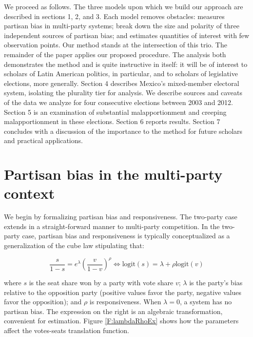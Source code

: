 \documentclass[letter,12pt]{article}
\begin{document}
We proceed as follows. The three models upon which we build our approach are described in sections 1, 2, and 3. Each model removes obstacles: \citet{king.1990elRespBiasMultiparty} measures partisan bias in multi-party systems; \citet{grofman.etalBiasMalapp.1997} break down the size and polarity of three independent sources of partisan bias; and \citet{linzerSeatVoteElasticity2012} estimates quantities of interest with few observation points. Our method stands at the intersection of this trio. The remainder of the paper applies our proposed procedure. The analysis both demonstrates the method and is quite instructive in itself: it will be of interest to scholars of Latin American politics, in particular, and to scholars of legislative elections, more generally. Section 4 describes Mexico's mixed-member electoral system, isolating the plurality tier for analysis. We describe sources and caveats of the data we analyze for four consecutive elections between 2003 and 2012. Section 5 is an examination of substantial malapportionment and creeping malapportionment in these elections. Section 6 reports results. Section 7 concludes with a discussion of the importance to the method for future scholars and practical applications. 

\section{Partisan bias in the multi-party context}

We begin by formalizing partisan bias and responsiveness. The two-party case \citep{taagepera.CubeLaw.1973,tufte1973seatsVotes,king.browning1987biasRespUS} extends in a straight-forward manner to multi-party competition. In the two-party case, partisan bias and responsiveness is typically conceptualized as a generalization of the cube law stipulating that:

\begin{equation}\label{E:kingBi}
 \frac{s}{1-s} = e^\lambda  \left(\frac{v}{1-v}\right)^\rho \iff
 \text{logit}(s) = \lambda + \rho  \text{logit}(v)
\end{equation}\label{E:cubeLaw}

\noindent where $s$ is the seat share won by a party with vote share $v$; $\lambda$ is the party's bias relative to the opposition party (positive values favor the party, negative values favor the opposition); and $\rho$ is responsiveness. When $\lambda=0$, a system has no partisan bias. The expression on the right is an algebraic transformation, convenient for estimation. Figure \ref{F:lambdaRhoEx} shows how the parameters affect the votes-seats translation function. 
\end{document}
